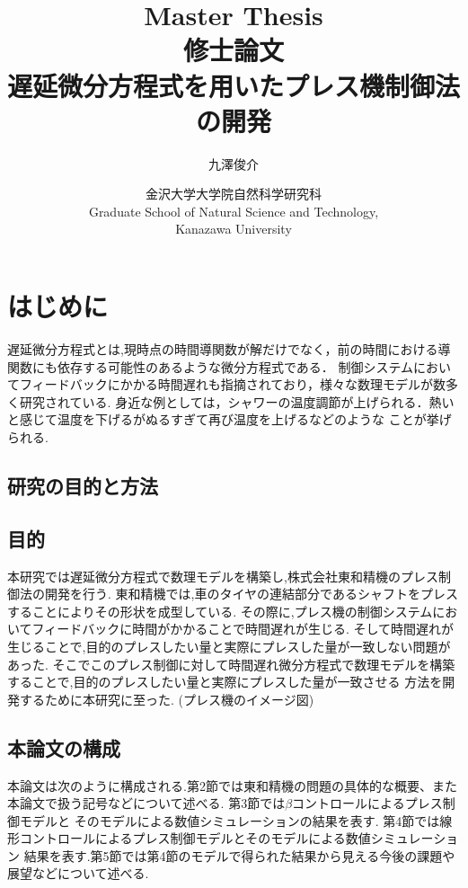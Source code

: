 \documentclass [dvipdfmx] {jsarticle}
\title{Master Thesis \\ \bigskip 
修士論文 \\ \bigskip 
{\bf  遅延微分方程式を用いたプレス機制御法の開発 }\\ \bigskip 
}
\author{九澤俊介}
\date{金沢大学大学院自然科学研究科 \\
Graduate School of Natural Science and Technology, \\
Kanazawa University}
\numberwithin{equation}{section}
\theoremstyle{definition} %
\theoremstyle{definition} %
\begin{document}
\maketitle
\thispagestyle{empty}
\setcounter{page}{-1}


\thispagestyle{empty}

\mbox{}\newpage 

\tableofcontents
\clearpage
\section{はじめに}

遅延微分方程式とは,現時点の時間導関数が解だけでなく，前の時間における導関数にも依存する可能性のあるような微分方程式である．
制御システムにおいてフィードバックにかかる時間遅れも指摘されており，様々な数理モデルが数多く研究されている.
身近な例としては，シャワーの温度調節が上げられる．熱いと感じて温度を下げるがぬるすぎて再び温度を上げるなどのような
ことが挙げられる.

\subsection{研究の目的と方法} 


\subsection{目的}
本研究では遅延微分方程式で数理モデルを構築し,株式会社東和精機のプレス制御法の開発を行う.
東和精機では,車のタイヤの連結部分であるシャフトをプレスすることによりその形状を成型している.
その際に,プレス機の制御システムにおいてフィードバックに時間がかかることで時間遅れが生じる.
そして時間遅れが生じることで,目的のプレスしたい量と実際にプレスした量が一致しない問題があった.
そこでこのプレス制御に対して時間遅れ微分方程式で数理モデルを構築することで,目的のプレスしたい量と実際にプレスした量が一致させる
方法を開発するために本研究に至った.
(プレス機のイメージ図)


\subsection{本論文の構成}
本論文は次のように構成される.第2節では東和精機の問題の具体的な概要、また本論文で扱う記号などについて述べる.
第3節では$\beta$コントロールによるプレス制御モデルと
そのモデルによる数値シミュレーションの結果を表す.
第4節では線形コントロールによるプレス制御モデルとそのモデルによる数値シミュレーション
結果を表す.第5節では第4節のモデルで得られた結果から見える今後の課題や展望などについて述べる.
\end{document}
